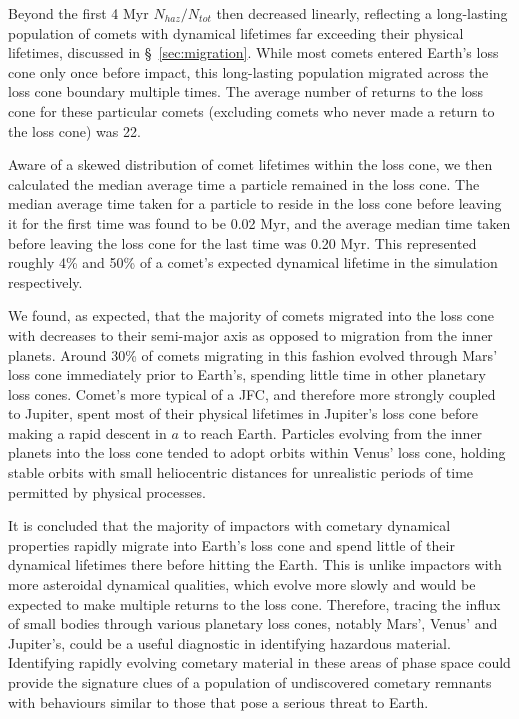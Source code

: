 Beyond the first 4 Myr $N_{haz}/N_{tot}$ then decreased linearly, reflecting a long-lasting population of comets with dynamical lifetimes far exceeding their physical lifetimes, discussed in \S~\ref{sec:migration}. While most comets entered Earth's loss cone only once before impact, this long-lasting population migrated across the loss cone boundary multiple times. The average number of returns to the loss cone for these particular comets (excluding comets who never made a return to the loss cone) was 22.

Aware of a skewed distribution of comet lifetimes within the loss cone, we then calculated the median average time a particle remained in the loss cone. The median average time taken for a particle to reside in the loss cone before leaving it for the first time was found to be 0.02 Myr, and the average median time taken before leaving the loss cone for the last time was 0.20 Myr. This represented roughly 4\% and 50\% of a comet's expected dynamical lifetime in the simulation respectively.

We found, as expected, that the majority of comets migrated into the loss cone with decreases to their semi-major axis as opposed to migration from the inner planets. Around 30\% of comets migrating in this fashion evolved through Mars' loss cone immediately prior to Earth's, spending little time in other planetary loss cones. Comet's more typical of a JFC, and therefore more strongly coupled to Jupiter, spent most of their physical lifetimes in Jupiter's loss cone before making a rapid descent in $a$ to reach Earth. Particles evolving from the inner planets into the loss cone tended to adopt orbits within Venus' loss cone, holding stable orbits with small heliocentric distances for unrealistic periods of time permitted by physical processes.

It is concluded that the majority of impactors with cometary dynamical properties rapidly migrate into Earth's loss cone and spend little of their dynamical lifetimes there before hitting the Earth. This is unlike impactors with more asteroidal dynamical qualities, which evolve more slowly and would be expected to make multiple returns to the loss cone. Therefore, tracing the influx of small bodies through various planetary loss cones, notably Mars', Venus' and Jupiter's, could be a useful diagnostic in identifying hazardous material. Identifying rapidly evolving cometary material in these areas of phase space could provide the signature clues of a population of undiscovered cometary remnants with behaviours similar to those that pose a serious threat to Earth.

